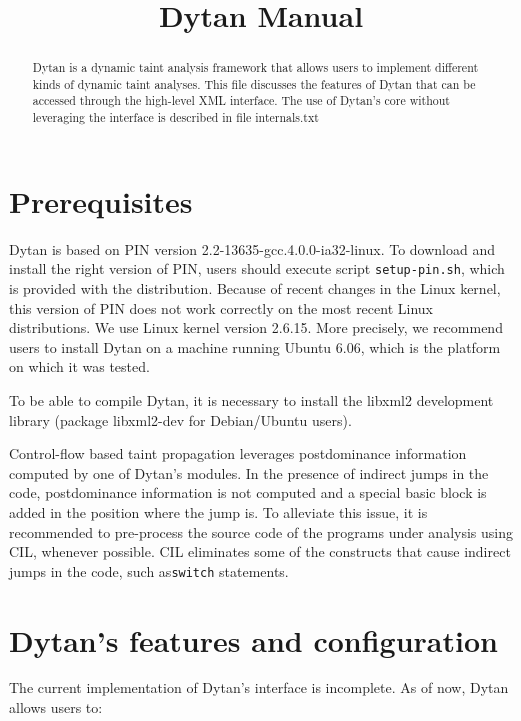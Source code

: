 \documentclass[letterpaper,10pt]{article}
\title{Dytan Manual}
\begin{document}
\maketitle

\tableofcontents

\begin{abstract}
Dytan is a dynamic taint analysis framework that allows users to
implement different kinds of dynamic taint analyses. This file
discusses the features of Dytan that can be accessed through the
high-level XML interface. The use of Dytan's core without leveraging
the interface is described in file internals.txt
\end{abstract}

\section{Prerequisites}

Dytan is based on PIN version 2.2-13635-gcc.4.0.0-ia32-linux. To
download and install the right version of PIN, users should execute
script \verb|setup-pin.sh|, which is provided with the distribution.
Because of recent changes in the Linux kernel, this version of PIN
does not work correctly on the most recent Linux distributions. We use
Linux kernel version 2.6.15. More precisely, we recommend users to
install Dytan on a machine running Ubuntu 6.06, which is the platform
on which it was tested.

To be able to compile Dytan, it is necessary to install the libxml2
development library (package libxml2-dev for Debian/Ubuntu users).

Control-flow based taint propagation leverages postdominance
information computed by one of Dytan's modules. In the presence of
indirect jumps in the code, postdominance information is not computed
and a special basic block is added in the position where the jump is.
To alleviate this issue, it is recommended to pre-process the source
code of the programs under analysis using CIL, whenever possible. CIL
eliminates some of the constructs that cause indirect jumps in the
code, such as\verb|switch| statements.

\section{Dytan's features and configuration}

The current implementation of Dytan's interface is incomplete. As of
now, Dytan allows users to:
\end{document}
